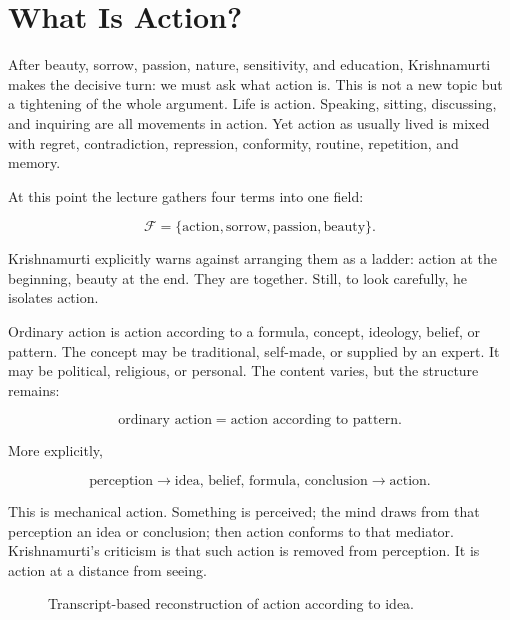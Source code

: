 \section{What Is Action?}

After beauty, sorrow, passion, nature, sensitivity, and education, Krishnamurti makes the decisive turn: we must ask what action is. This is not a new topic but a tightening of the whole argument. Life is action. Speaking, sitting, discussing, and inquiring are all movements in action. Yet action as usually lived is mixed with regret, contradiction, repression, conformity, routine, repetition, and memory.

At this point the lecture gathers four terms into one field:

\begin{equation}
\mathcal{F}
=
\{\text{action},\text{sorrow},\text{passion},\text{beauty}\}.
\end{equation}

Krishnamurti explicitly warns against arranging them as a ladder: action at the beginning, beauty at the end. They are together. Still, to look carefully, he isolates action.

Ordinary action is action according to a formula, concept, ideology, belief, or pattern. The concept may be traditional, self-made, or supplied by an expert. It may be political, religious, or personal. The content varies, but the structure remains:

\begin{equation}
\text{ordinary action}
=
\text{action according to pattern}.
\end{equation}

More explicitly,

\begin{equation}
\text{perception}
\longrightarrow
\text{idea, belief, formula, conclusion}
\longrightarrow
\text{action}.
\end{equation}

This is mechanical action. Something is perceived; the mind draws from that perception an idea or conclusion; then action conforms to that mediator. Krishnamurti's criticism is that such action is removed from perception. It is action at a distance from seeing.

\begin{figure}
\centering
{}
\caption{Transcript-based reconstruction of action according to idea.}
\end{figure}

